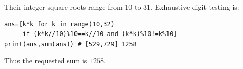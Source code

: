 Their integer square roots range from 10 to 31. Exhaustive digit testing is:\begin{verbatim}
ans=[k*k for k in range(10,32)
     if (k*k//10)%10==k//10 and (k*k)%10!=k%10]
print(ans,sum(ans)) # [529,729] 1258
\end{verbatim}
Thus the requested sum is $\boxed{1258}$.
